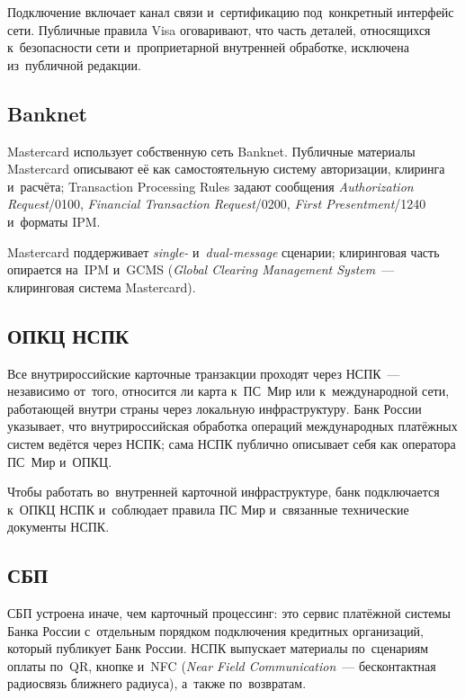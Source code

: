 Подключение включает канал связи и~сертификацию под~конкретный интерфейс сети.
Публичные правила Visa оговаривают, что часть деталей, относящихся
к~безопасности сети и~проприетарной внутренней обработке, исключена
из~публичной редакции.~\cite{visa-core-rules}

\subsection*{Banknet}

Mastercard использует собственную сеть Banknet. Публичные материалы Mastercard
описывают её как самостоятельную систему авторизации, клиринга и~расчёта;
Transaction Processing Rules задают сообщения \textit{Authorization
Request}/0100, \textit{Financial Transaction Request}/0200,
\textit{First Presentment}/1240 и~форматы
IPM.~\cite{mc-switching-services,mc-tpr}

Mastercard поддерживает \textit{single-} и~\textit{dual-message} сценарии; клиринговая часть
опирается на~IPM и~GCMS (\textit{Global Clearing Management System}~---
клиринговая система Mastercard).~\cite{mc-switching-services,mc-tpr}

\subsection*{ОПКЦ НСПК}

Все внутрироссийские карточные транзакции проходят через НСПК~--- независимо
от~того, относится ли карта к~ПС~Мир или к~международной сети,
работающей внутри страны через локальную инфраструктуру. Банк России
указывает, что внутрироссийская обработка операций международных платёжных
систем ведётся через НСПК; сама НСПК публично описывает себя как оператора ПС~Мир
и~ОПКЦ.~\cite{cbr-ps,nspk-about-company}

Чтобы работать во~внутренней карточной инфраструктуре, банк подключается
к~ОПКЦ НСПК и~соблюдает правила ПС Мир и~связанные технические документы
НСПК.~\cite{nspk-mir-rules}

\subsection*{СБП}

СБП устроена иначе, чем карточный процессинг: это сервис платёжной системы
Банка России с~отдельным порядком подключения кредитных организаций, который
публикует Банк России. НСПК выпускает материалы
по~сценариям оплаты по~QR, кнопке и~NFC (\textit{Near Field Communication}~---
бесконтактная радиосвязь ближнего радиуса), а~также
по~возвратам.~\cite{cbr-sbp-actions,sbp-main,sbp-faq-business}

